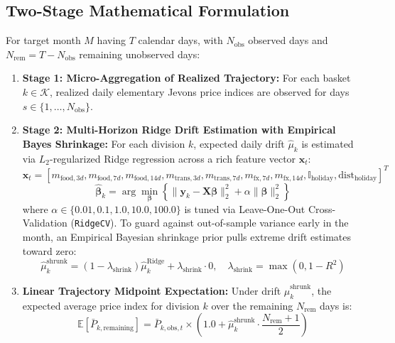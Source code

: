 \documentclass[11pt,a4paper]{article}
\begin{document}
\subsection{Two-Stage Mathematical Formulation}
For target month $M$ having $T$ calendar days, with $N_{\text{obs}}$ observed days and $N_{\text{rem}} = T - N_{\text{obs}}$ remaining unobserved days:
\begin{enumerate}
    \item \textbf{Stage 1: Micro-Aggregation of Realized Trajectory:}
        For each basket $k \in \mathcal{K}$, realized daily elementary Jevons price indices are observed for days $s \in \{1, \dots, N_{\text{obs}}\}$.
    \item \textbf{Stage 2: Multi-Horizon Ridge Drift Estimation with Empirical Bayes Shrinkage:}
        For each division $k$, expected daily drift $\hat{\mu}_k$ is estimated via $L_2$-regularized Ridge regression across a rich feature vector $\mathbf{x}_t$:
        \begin{equation}
        \mathbf{x}_t = \left[ m_{\text{food}, 3d}, m_{\text{food}, 7d}, m_{\text{food}, 14d}, m_{\text{trans}, 3d}, m_{\text{trans}, 7d}, m_{\text{fx}, 7d}, m_{\text{fx}, 14d}, \mathbb{I}_{\text{holiday}}, \text{dist}_{\text{holiday}} \right]^T
        \end{equation}
        \begin{equation}
        \hat{\boldsymbol{\beta}}_k = \arg\min_{\boldsymbol{\beta}} \left\{ \|\mathbf{y}_k - \mathbf{X}\boldsymbol{\beta}\|_2^2 + \alpha \|\boldsymbol{\beta}\|_2^2 \right\}
        \end{equation}
        where $\alpha \in \{0.01, 0.1, 1.0, 10.0, 100.0\}$ is tuned via Leave-One-Out Cross-Validation (\texttt{RidgeCV}).
        To guard against out-of-sample variance early in the month, an Empirical Bayesian shrinkage prior pulls extreme drift estimates toward zero:
        \begin{equation}
        \hat{\mu}_k^{\text{shrunk}} = \left(1 - \lambda_{\text{shrink}}\right) \hat{\mu}_k^{\text{Ridge}} + \lambda_{\text{shrink}} \cdot 0, \quad \lambda_{\text{shrink}} = \max(0, 1 - R^2)
        \end{equation}
    \item \textbf{Linear Trajectory Midpoint Expectation:}
        Under drift $\hat{\mu}_k^{\text{shrunk}}$, the expected average price index for division $k$ over the remaining $N_{\text{rem}}$ days is:
        \begin{equation}
        \mathbb{E}[\bar{P}_{k, \text{remaining}}] = \bar{P}_{k, \text{obs}, t} \times \left( 1.0 + \hat{\mu}_k^{\text{shrunk}} \cdot \frac{N_{\text{rem}} + 1}{2} \right)

\end{equation}
\end{enumerate}
\end{document}
